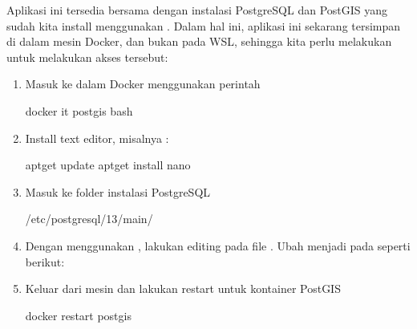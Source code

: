 \documentclass[letterpaper,10pt,english]{sphinxmanual}
\begin{document}
Aplikasi ini tersedia bersama dengan instalasi PostgreSQL dan PostGIS yang sudah kita install menggunakan . Dalam hal ini, aplikasi ini sekarang tersimpan di dalam mesin Docker, dan bukan pada WSL, sehingga kita perlu melakukan  untuk melakukan akses tersebut:
\begin{enumerate}
%
\item {} 
Masuk ke dalam Docker menggunakan perintah 

\begin{sphinxVerbatim}[commandchars=\\\{\}]
docker  \PYGZhy{}it postgis bash
\end{sphinxVerbatim}

\item {} 
Install text editor, misalnya :

\begin{sphinxVerbatim}[commandchars=\\\{\}]
apt\PYGZhy{}get update  apt\PYGZhy{}get install nano
\end{sphinxVerbatim}

\item {} 
Masuk ke folder instalasi PostgreSQL

\begin{sphinxVerbatim}[commandchars=\\\{\}]
 /etc/postgresql/13/main/
\end{sphinxVerbatim}

\item {} 
Dengan menggunakan , lakukan editing pada file . Ubah  menjadi  pada  seperti berikut:

\item {} 
Keluar dari mesin dan lakukan restart untuk kontainer PostGIS

\begin{sphinxVerbatim}[commandchars=\\\{\}]
docker restart postgis
\end{sphinxVerbatim}


\end{enumerate}
\end{document}
